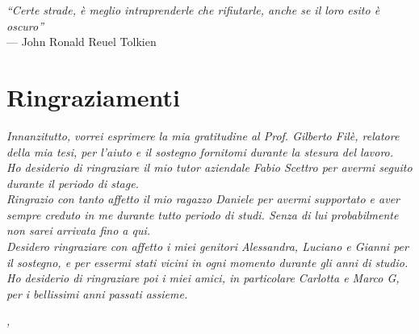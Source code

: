 
\cleardoublepage
{}
{}

\begin{flushright}{
	\slshape    
	``Certe strade, è meglio intraprenderle che rifiutarle, anche se il loro esito è oscuro''} \\ 
	\medskip
    --- John Ronald Reuel Tolkien
\end{flushright}


\bigskip

\begingroup
\let\clearpage\relax
\let\cleardoublepage\relax
\let\cleardoublepage\relax

\chapter*{Ringraziamenti}

\noindent \textit{Innanzitutto, vorrei esprimere la mia gratitudine al Prof. Gilberto Filè, relatore della mia tesi, per l'aiuto e il sostegno fornitomi durante la stesura del lavoro.}\\

\noindent \textit{Ho desiderio di ringraziare il mio tutor aziendale Fabio Scettro per avermi seguito durante il periodo di stage.}\\

\noindent \textit{Ringrazio con tanto affetto il mio ragazzo Daniele per avermi supportato e aver sempre creduto in me durante tutto periodo di studi. Senza di lui probabilmente non sarei arrivata fino a qui.}\\

\noindent \textit{Desidero ringraziare con affetto i miei genitori Alessandra, Luciano e Gianni per il sostegno, e per essermi stati vicini in ogni momento durante gli anni di studio.}\\

\noindent \textit{Ho desiderio di ringraziare poi i miei amici, in particolare Carlotta e Marco G, per i bellissimi anni passati assieme.}\\
\bigskip

\noindent\textit{\myLocation, \myTime}
\hfill \myName

\endgroup

